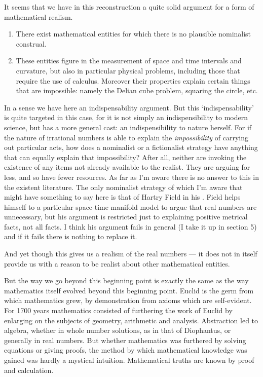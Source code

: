 \documentclass[11pt,oneside,a4paper]{article}
\begin{document}
It seems that we have in this reconstruction a quite solid argument for a form of mathematical realism.
\begin{enumerate}[label=\emph{\alph*})]
  \item There exist mathematical entities for which there is no plausible nominalist construal.
  
  \item These entities figure in the measurement of space and time intervals  and curvature, but also in particular physical problems, including those that require the use of calculus. Moreover their properties explain certain things that are impossible: namely the Delian cube problem, squaring the circle, etc.
 \end{enumerate}
In a sense we have here an indispensability argument. But this `indispensability' is quite targeted in this case, for it is not simply an indispensibility to modern science, but has a more general cast: an indispensibility to nature herself. For if the nature of irrational numbers is able to explain the \textit{impossibility} of carrying out particular acts, how does a nominalist or a fictionalist strategy have anything that can equally explain that impossibility? After all, neither are invoking the existence of any items not already available to the realist. They are arguing for less, and so have fewer resources. As far as I'm aware there is no answer to this in the existent literature. The only nominalist strategy of which I'm aware that might have something to say here is that of Hartry Field in his \parencite*{field_science_1980}. Field helps himself to a particular space-time manifold model to argue that real numbers are unnecessary, but his argument is restricted just to explaining positive metrical facts, not all facts. I think his argument fails in general (I take it up in section 5) and if it fails there is nothing to replace it.

And yet though this gives us a realism of the real numbers --- it does not in itself provide us with a reason to be realist about other mathematical entities.

But the way we go beyond this beginning point is exactly the same as the way mathematics itself evolved beyond this beginning point. Euclid is the germ from which mathematics grew, by demonstration from axioms which are self-evident. For 1700 years mathematics consisted of furthering the work of Euclid by enlarging on the subjects of geometry, arithmetic and analysis. Abstraction led to algebra, whether in whole number solutions, as in that of Diophantus, or generally in real numbers. But whether mathematics was furthered by solving equations or giving proofs, the method by which mathematical knowledge was gained was hardly a mystical intuition. Mathematical truths are known by proof and calculation.
\end{document}
